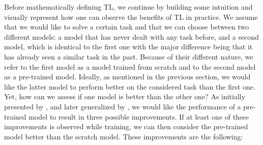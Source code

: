Before mathematically defining TL, we continue by building some intuition and visually represent how one can observe the benefits of TL in practice. We assume that we would like to solve a certain task and that we can choose between two different models: a model that has never dealt with any task before, and a second model, which is identical to the first one with the major difference being that it has already seen a similar task in the past. Because of their different nature, we refer to the first model as a model trained from scratch and to the second model as a pre-trained model. Ideally, as mentioned in the previous section, we would like the latter model to perform better on the considered task than the first one. Yet, how can we assess if one model is better than the other one? As initially presented by \citet{langley2006transfer}, and later generalized by \citet{lazaric2012transfer}, we would like the performance of a pre-trained model to result in three possible improvements. If at least one of these improvements is observed while training, we can then consider the pre-trained model better than the scratch model. These improvements are the following:
